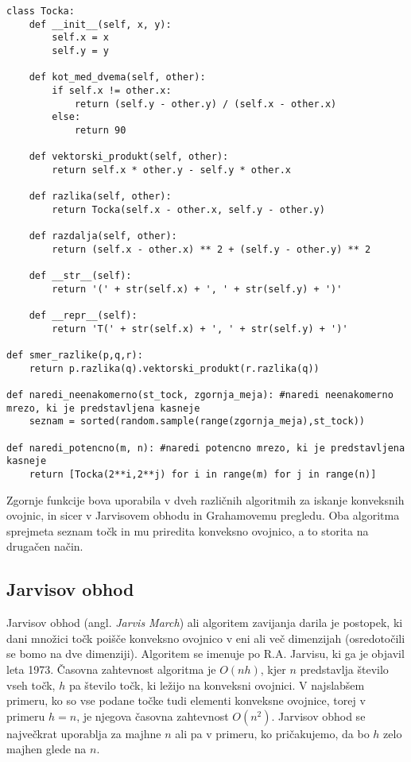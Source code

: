 \documentclass[a4paper]{article}
\begin{document}
\begin{lstlisting}
class Tocka:
    def __init__(self, x, y):
        self.x = x
        self.y = y

    def kot_med_dvema(self, other):
        if self.x != other.x:
            return (self.y - other.y) / (self.x - other.x)
        else:
            return 90

    def vektorski_produkt(self, other):
        return self.x * other.y - self.y * other.x

    def razlika(self, other):
    	return Tocka(self.x - other.x, self.y - other.y)
    
    def razdalja(self, other):
        return (self.x - other.x) ** 2 + (self.y - other.y) ** 2

    def __str__(self):
        return '(' + str(self.x) + ', ' + str(self.y) + ')'

    def __repr__(self):
        return 'T(' + str(self.x) + ', ' + str(self.y) + ')'

def smer_razlike(p,q,r):
    return p.razlika(q).vektorski_produkt(r.razlika(q))

def naredi_neenakomerno(st_tock, zgornja_meja): #naredi neenakomerno mrezo, ki je predstavljena kasneje
    seznam = sorted(random.sample(range(zgornja_meja),st_tock))

def naredi_potencno(m, n): #naredi potencno mrezo, ki je predstavljena kasneje
    return [Tocka(2**i,2**j) for i in range(m) for j in range(n)]
\end{lstlisting}

Zgornje funkcije bova uporabila v dveh različnih algoritmih za iskanje konveksnih ovojnic, in sicer v Jarvisovem obhodu in Grahamovemu pregledu.
Oba algoritma sprejmeta seznam točk in mu priredita konveksno ovojnico, a to storita na drugačen način.

\newpage
\subsection{Jarvisov obhod}
Jarvisov obhod (angl. \textit{Jarvis March}) ali algoritem zavijanja darila je postopek, ki dani množici točk poišče konveksno ovojnico v eni ali več dimenzijah (osredotočili se 
bomo na dve dimenziji). Algoritem se imenuje po R.A. Jarvisu, ki ga je objavil leta 1973. Časovna zahtevnost algoritma je $O(nh)$, kjer $n$ predstavlja število vseh točk, $h$ pa 
število točk, ki ležijo na konveksni ovojnici. V najslabšem primeru, ko so vse podane točke tudi elementi konveksne ovojnice, torej v primeru $h = n$, je njegova časovna zahtevnost 
$O(n^2)$. Jarvisov obhod se največkrat uporablja za majhne $n$ ali pa v primeru, ko pričakujemo, da bo $h$ zelo majhen glede na $n$.
\end{document}
